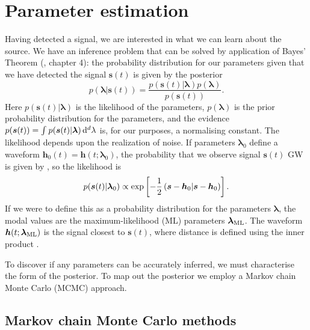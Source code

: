 \section{Parameter estimation}\label{sec:Estimation}

Having detected a signal, we are interested in what we can learn about the source. We have an inference problem that can be solved by  application of Bayes' Theorem (\citealt{Jaynes2003}, chapter 4): the probability distribution for our parameters given that we have detected the signal $\boldsymbol{s}(t)$ is given by the posterior
\begin{equation}
p(\boldsymbol{\lambda}|\boldsymbol{s}(t)) = \frac{p(\boldsymbol{s}(t)|\boldsymbol{\lambda})p(\boldsymbol{\lambda})}{p(\boldsymbol{s}(t))}.
\end{equation}
Here $p(\boldsymbol{s}(t)|\boldsymbol{\lambda})$ is the likelihood of the parameters, $p(\boldsymbol{\lambda})$ is the prior probability distribution for the parameters, and the evidence $p(\boldsymbol{s}(t)) = \int_{}^{}{p(\boldsymbol{s}(t)|\boldsymbol{\lambda})}\,\mathrm{d}{^d \lambda}$ is, for our purposes, a normalising constant. The likelihood depends upon the realization of noise. If parameters $\boldsymbol{\lambda}_0$ define a waveform $\boldsymbol{h}_0(t) = \boldsymbol{h}(t; \boldsymbol{\lambda}_0)$, the probability that we observe signal $\boldsymbol{s}(t)$ GW is given by , so the likelihood is
\begin{equation}
p(\boldsymbol{s}(t)|\boldsymbol{\lambda}_0) \propto \exp\left[-\frac{1}{2}\left({\boldsymbol{s}-\boldsymbol{h}_0}\middle|{\boldsymbol{s}-\boldsymbol{h}_0}\right)\right].
\label{eq:likelihood}
\end{equation}
If we were to define this as a probability distribution for the parameters $\boldsymbol{\lambda}$, the modal values are the maximum-likelihood (ML) parameters $\boldsymbol{\lambda}_\mathrm{ML}$. The waveform $\boldsymbol{h}(t; \boldsymbol{\lambda}_\mathrm{ML})$ is the signal closest to $\boldsymbol{s}(t)$, where distance is defined using the inner product  \citep{Cutler1994}.

To discover if any parameters can be accurately inferred, we must characterise the form of the posterior. To map out the posterior we employ a Markov chain Monte Carlo (MCMC) approach.

\subsection{Markov chain Monte Carlo methods}

